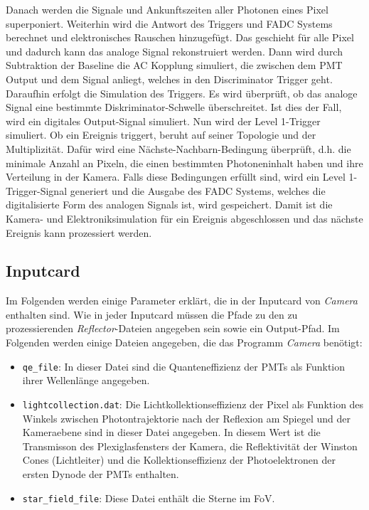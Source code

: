 Danach werden die Signale und Ankunftszeiten aller Photonen eines Pixel superponiert.
Weiterhin wird die Antwort des Triggers und FADC Systems berechnet und elektronisches Rauschen hinzugefügt.
Das geschieht für alle Pixel und dadurch kann das analoge Signal rekonstruiert werden.
Dann wird durch Subtraktion der Baseline die AC Kopplung simuliert, die zwischen dem PMT Output und dem Signal anliegt, welches in den Discriminator Trigger geht.
Daraufhin erfolgt die Simulation des Triggers. 
Es wird überprüft, ob das analoge Signal eine bestimmte Diskriminator-Schwelle überschreitet.
Ist dies der Fall, wird ein digitales Output-Signal simuliert.
Nun wird der Level 1-Trigger simuliert.
Ob ein Ereignis triggert, beruht auf seiner Topologie und der Multiplizität.
Dafür wird eine Nächste-Nachbarn-Bedingung überprüft, d.h. die minimale Anzahl an Pixeln, die einen bestimmten Photoneninhalt haben und ihre Verteilung in der Kamera.
Falls diese Bedingungen erfüllt sind, wird ein Level 1-Trigger-Signal generiert und die Ausgabe des FADC Systems, welches die digitalisierte Form des analogen Signals ist, wird gespeichert.
Damit ist die Kamera- und Elektroniksimulation für ein Ereignis abgeschlossen und das nächste Ereignis kann prozessiert werden.

\subsection{Inputcard}
Im Folgenden werden einige Parameter erklärt, die in der Inputcard von \textit{Camera} enthalten sind.
Wie in jeder Inputcard müssen die Pfade zu den zu prozessierenden \textit{Reflector}-Dateien angegeben sein sowie ein Output-Pfad.
Im Folgenden werden einige Dateien angegeben, die das Programm \textit{Camera} benötigt:

\begin{itemize}
 \item \texttt{qe\_file}: In dieser Datei sind die Quanteneffizienz der PMTs als Funktion ihrer Wellenlänge angegeben.
 \item \texttt{lightcollection.dat}: Die Lichtkollektionseffizienz der Pixel als Funktion des Winkels zwischen Photontrajektorie nach der Reflexion am Spiegel und der Kameraebene sind in dieser Datei angegeben.
 In diesem Wert ist die Transmisson des Plexiglasfensters der Kamera, die Reflektivität der Winston Cones (Lichtleiter) und die Kollektionseffizienz der Photoelektronen der ersten Dynode der PMTs enthalten.
 \item \texttt{star\_field\_file}: Diese Datei enthält die Sterne im FoV.
\end{itemize}

